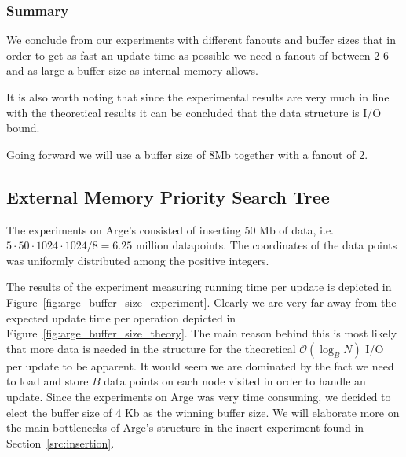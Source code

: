 \documentclass[twoside,11pt,openright]{report}
\begin{document}
\clearpage

\subsubsection*{Summary}

We conclude from our experiments with different fanouts and buffer sizes that in order to get as fast an update time as possible we need a fanout of between 2-6 and as large a buffer size as internal memory allows.

It is also worth noting that since the experimental results are very much in line with the theoretical results it can be concluded that the data structure is I/O bound.

Going forward we will use a buffer size of 8Mb together with a fanout of 2. 

\subsection{External Memory Priority Search Tree}
\label{subsec:tuning_arge}

The experiments on Arge's consisted of inserting 50 Mb of data, i.e. $5 \cdot 50 \cdot 1024 \cdot 1024 / 8 = 6.25$ million datapoints. The coordinates of the data points was uniformly distributed among the positive integers. 

The results of the experiment measuring running time per update is depicted in Figure~\ref{fig:arge_buffer_size_experiment}. Clearly we are very far away from the expected update time per operation depicted in Figure~\ref{fig:arge_buffer_size_theory}. The main reason behind this is most likely that more data is needed in the structure for the theoretical $\mathcal{O}(\log_B N)$ I/O per update to be apparent. It would seem we are dominated by the fact we need to load and store $B$ data points on each node visited in order to handle an update. Since the experiments on Arge was very time consuming, we decided to elect the buffer size of 4 Kb as the winning buffer size. We will elaborate more on the main bottlenecks of Arge's structure in the insert experiment found in Section~\ref{src:insertion}.
\end{document}

